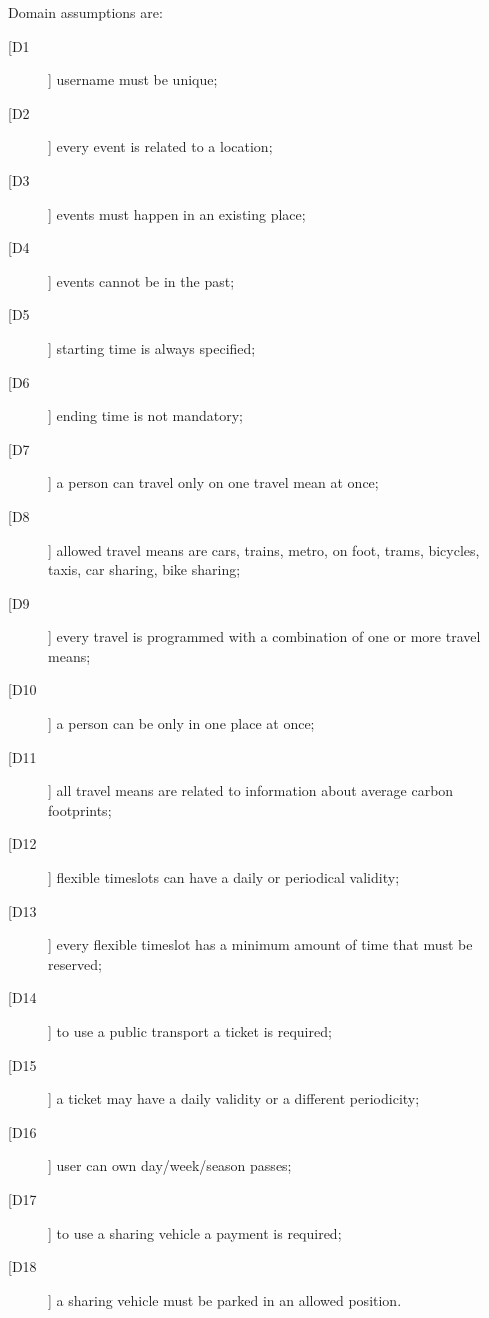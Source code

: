 Domain assumptions are:
\begin{description}
\item[[D1]] username must be unique;
\item[[D2]] every event is related to a location;
\item[[D3]] events must happen in an existing place;
\item[[D4]] events cannot be in the past;
\item[[D5]] starting time is always specified;
\item[[D6]] ending time is not mandatory;
\item[[D7]] a person can travel only on one travel mean at once; 
\item[[D8]] allowed travel means are cars, trains, metro, on foot, trams, bicycles, taxis, car sharing, bike sharing;
\item[[D9]] every travel is programmed with a combination of one or more travel means;
\item[[D10]] a person can be only in one place at once;
\item[[D11]] all travel means are related to information about average carbon footprints; 
\item[[D12]] flexible timeslots can have a daily or periodical validity;
\item[[D13]] every flexible timeslot has a minimum amount of time that must be reserved;
\item[[D14]] to use a public transport a ticket is required; 
\item[[D15]] a ticket may have a daily validity or a different periodicity; 
\item[[D16]] user can own day/week/season passes;
\item[[D17]] to use a sharing vehicle a payment is required;
\item[[D18]] a sharing vehicle must be parked in an allowed position.
\end{description}
